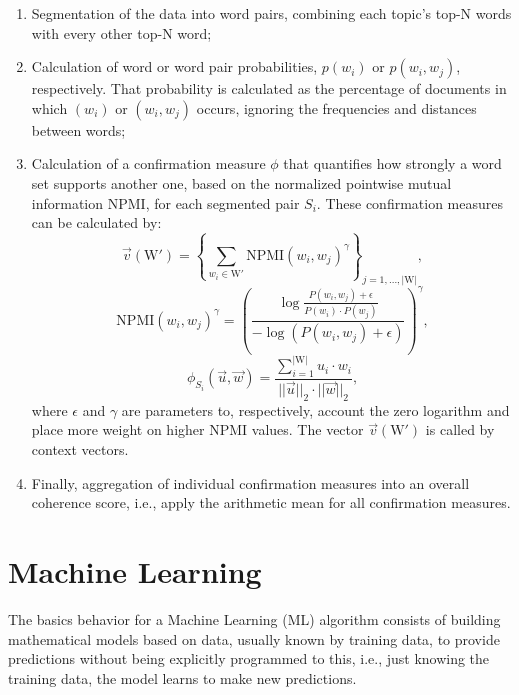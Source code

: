 	\begin{enumerate}
		\item Segmentation of the data into word pairs, combining each topic's top-N words with every other top-N word;

		\item Calculation of word or word pair probabilities, $p(w_{i})$ or $p(w_{i}, w_{j})$, respectively. That probability is calculated as the percentage of documents in which $(w_{i})$ or $(w_{i},w_{j})$ occurs, ignoring the frequencies and distances between words;

		\item Calculation of a confirmation measure $\phi$ that quantifies how strongly a word set supports another one, based on the normalized pointwise mutual information $\text{NPMI}$, for each segmented pair $S_{i}$. These confirmation measures can be calculated by:
		\begin{equation}
			\vec v (\text{W}') = \left\{ \sum_{w_{i} \in \text{W}'} \text{NPMI} (w_{i}, w_{j})^{\gamma} \right\}_{j=1,...,|\text{W}|} \text{,}
		\end{equation}
		\begin{equation}
			\text{NPMI} (w_{i}, w_{j})^{\gamma} = \left( \dfrac{\log \frac{P(w_{i}, w_{j}) + \epsilon}{P(w_{i}) \cdot P(w_{j})} }{- \log (P(w_{i}, w_{j}) + \epsilon) } \right)^{\gamma} \text{,}
		\end{equation}
		\begin{equation}
			\phi_{S_{i}}(\vec u , \vec w) = \dfrac{ \sum_{i=1}^{|\text{W}|} u_{i} \cdot w_{i} }{||\vec{u}||_{2} \cdot ||\vec{w}||_{2}} \text{,}
		\end{equation}
		where $\epsilon$ and $\gamma$ are parameters to, respectively, account the zero logarithm and place more weight on higher $\text{NPMI}$ values. The vector $\vec{v}(\text{W}')$ is called by context vectors.

		\item Finally, aggregation of individual confirmation measures into an overall coherence score, i.e., apply the arithmetic mean for all confirmation measures.
	\end{enumerate}

\section{Machine Learning}

	The basics behavior for a Machine Learning (ML) algorithm consists of building mathematical models based on data, usually known by training data, to provide predictions without being explicitly programmed to this, i.e., just knowing the training data, the model learns to make new predictions.

